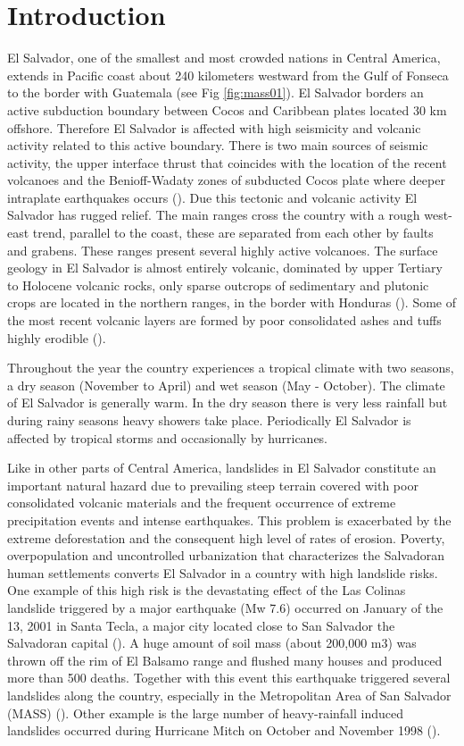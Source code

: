 \documentclass[11pt,twoside]{rmta2010esp}%
\begin{document}
\section{Introduction}
\label{sec:intr}
El Salvador, one of the smallest and most crowded nations in Central America, extends in Pacific coast about 240 kilometers westward from the Gulf of Fonseca to the border with Guatemala (see Fig \ref{fig:mass01}). El Salvador borders an active subduction boundary between Cocos and Caribbean plates located 30 km offshore. Therefore El Salvador is affected with high seismicity and volcanic activity related to this active boundary. There is two main sources of seismic activity, the upper interface thrust that coincides with the location of the recent volcanoes and the Benioff-Wadaty zones of subducted Cocos plate where deeper intraplate earthquakes occurs (\cite{dewey}). Due this tectonic and volcanic activity El Salvador has rugged relief. The main ranges cross the country with a rough west-east trend, parallel to the coast, these are separated from each other by faults and grabens. These ranges present several highly active volcanoes. The surface geology in El Salvador is almost entirely volcanic, dominated by upper Tertiary to Holocene volcanic rocks, only sparse outcrops of sedimentary and plutonic crops are located in the northern ranges, in the border with Honduras (\cite{weber}). Some of the most recent volcanic layers are formed by poor consolidated ashes and tuffs highly erodible (\cite{bommer}).

Throughout the year the country experiences a tropical climate with two seasons, a dry season (November to April) and wet season (May - October). The climate of El Salvador is generally warm. In the dry season there is very less rainfall but during rainy seasons heavy showers take place. Periodically El Salvador is affected by tropical storms and occasionally by hurricanes.

Like in other parts of Central America, landslides in El Salvador constitute an important natural hazard due to prevailing steep terrain covered with poor consolidated volcanic materials and the frequent occurrence of extreme precipitation events and intense earthquakes. This problem is exacerbated by the extreme deforestation and the consequent high level of rates of erosion. Poverty, overpopulation and uncontrolled urbanization that characterizes the Salvadoran human settlements converts El Salvador in a country with high landslide risks.
One example of this high risk is the devastating effect of the Las Colinas landslide triggered by a major earthquake (Mw 7.6) occurred on January of the 13, 2001  in Santa Tecla, a major city located close to San Salvador  the Salvadoran capital (\cite{evans}). A huge amount of soil mass (about 200,000 m3) was thrown off the rim of El Balsamo range and flushed many houses and produced more than 500 deaths. Together with this event this earthquake triggered several landslides along the country, especially in the Metropolitan Area of San Salvador (MASS) (\cite{jibson}). Other example is the large number of heavy-rainfall induced landslides occurred during Hurricane Mitch on October and November 1998 (\cite{crone}).   
\end{document}
